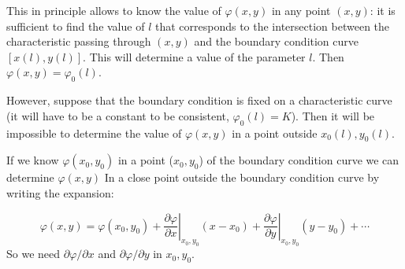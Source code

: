 \documentclass{article}
\begin{document}
\newpage

\noindent
This in principle allows to know the value of $\varphi(x,y)$ in any point $(x,y)$: it is sufficient to find the value of $l$ that corresponds to the intersection between the characteristic passing through $(x,y)$ and the boundary condition curve $[x(l), y(l)]$. This will determine a value of the parameter $l$. Then $\varphi(x,y) = \varphi_0(l)$.

\vspace{2mm}\noindent
However, suppose that the boundary condition is fixed on a characteristic curve (it will have to be a constant to be consistent, $\varphi_0(l) = K$). Then it will be impossible to determine the value of $\varphi(x,y)$ in a point outside $x_0(l), y_0(l)$.

\vspace{2mm}\noindent
If we know $\varphi(x_0, y_0)$ in a point ($x_0, y_0$) of the boundary condition curve we can determine $\varphi(x,y)$ In a close point outside the boundary condition curve by writing the expansion:

\begin{equation}
    \varphi(x, y) = \varphi(x_0, y_0) + \left. \frac{\partial \varphi}{\partial x} \right|_{x_0, y_0} (x - x_0) + \left. \frac{\partial \varphi}{\partial y} \right|_{x_0, y_0} (y - y_0) + \cdots
\end{equation}
So we need $\partial \varphi / \partial x$ and $\partial \varphi / \partial y$ in $x_0, y_0$.
\end{document}

